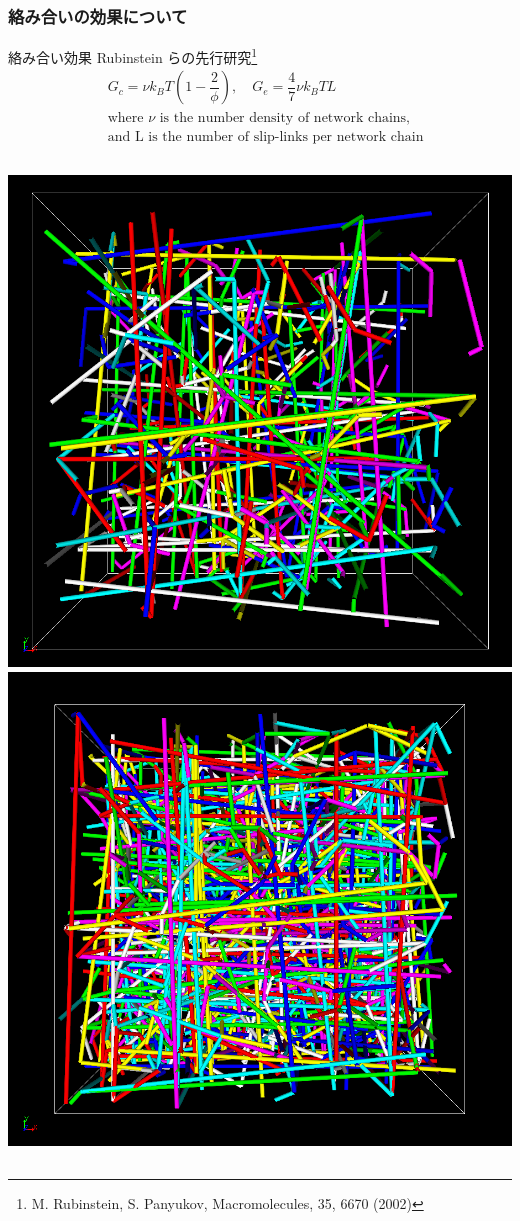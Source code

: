 \documentclass[12pt, dvipdfmx]{beamer}
\begin{document}
\begin{frame}
    \frametitle{絡み合いの効果について}
	\vspace{-3mm}
	\begin{alertblock}{絡み合い効果}
			\small
			Rubinstein らの先行研究\footnote{
				\scriptsize{M. Rubinstein, S. Panyukov, Macromolecules, 35, 6670 (2002)}
				}
			\vspace{-3mm}
			\scriptsize
			\begin{align*}
				&G_c = \nu k_B T \left(1-\dfrac{2}{\phi} \right), \quad G_e = \dfrac{4}{7} \nu k_B T L \\
				&\text{where $\nu$ is the number density of network chains,} \\
				& \text{and L is the number of slip-links per network chain}
			\end{align*}
	\end{alertblock}
	\begin{columns}[onlytextwidth]
			\centering
			\vspace{3mm}
			\includegraphics[width=.8\textwidth]{z_cord_NPT_4Chain.png}
			\vspace{2mm}
				\includegraphics[width=.8\textwidth]{z_cord_4Chain.png}

\end{columns}
\end{frame}
\end{document}
